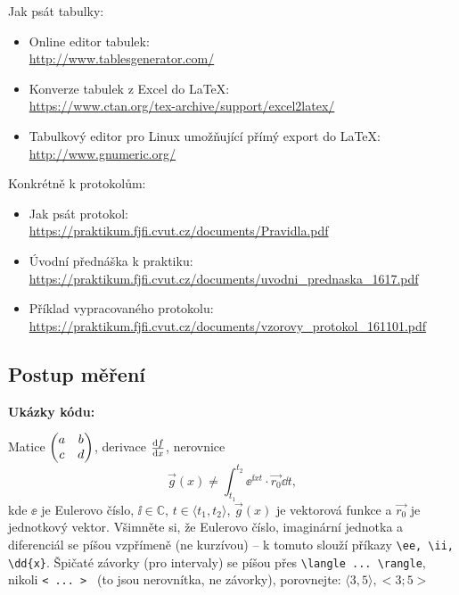 		Jak psát tabulky:
		\begin{itemize}
		\item Online editor tabulek: \\
				\url{http://www.tablesgenerator.com/}
				\item Konverze tabulek z Excel do \LaTeX:\\
				\url{https://www.ctan.org/tex-archive/support/excel2latex/}
				\item Tabulkový editor pro Linux umožňující přímý export do \LaTeX:\\
				\url{http://www.gnumeric.org/}
		\end{itemize}
		
		Konkrétně k protokolům:
		\begin{itemize}
		\item Jak psát protokol: \\
		\url{https://praktikum.fjfi.cvut.cz/documents/Pravidla.pdf}
		\item Úvodní přednáška k praktiku:\\
		\url{https://praktikum.fjfi.cvut.cz/documents/uvodni_prednaska_1617.pdf}
		\item Příklad vypracovaného protokolu:\\
		\url{https://praktikum.fjfi.cvut.cz/documents/vzorovy_protokol_161101.pdf}
		\end{itemize}


	\subsection{Postup měření}
	
\textbf{Ukázky kódu:}
		
		Matice $	\mqty(a & b \\ c & d)$, derivace $\dv{f}{x} $, nerovnice
		\begin{equation}
			\label{eq:rovnice}
			\vec g(x)\not=\int_{t_1}^{t_2} \ee^{\ii xt}\cdot \vec{r_0}\dd{t},
		\end{equation}
		kde $\ee$ je Eulerovo číslo, $\ii\in\mathbb{C}$, $t\in\langle t_1,t_2\rangle$, $\vec g(x)$ je vektorová funkce a $\vec{r_0}$ je jednotkový vektor. Všimněte si, že Eulerovo číslo, imaginární jednotka a diferenciál se píšou vzpřímeně (ne kurzívou) -- k tomuto slouží příkazy \verb|\ee, \ii, \dd{x}|. Špičaté závorky (pro intervaly) se píšou přes \verb|\langle ... \rangle|, nikoli \verb|< ... > | (to jsou nerovnítka, ne závorky), porovnejte: $\langle 3,5 \rangle, <3;5>$					
		
